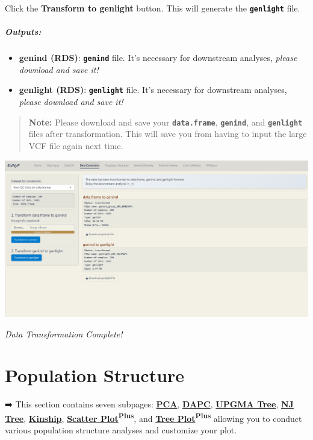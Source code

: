 \documentclass[
]{book}
\begin{document}
Click the {\textbf{Transform to genlight}} button. This will generate the {\textbf{\texttt{genlight}}} file.

\paragraph*{Outputs:}\label{outputs-4}

\begin{itemize}
\item
  \textbf{genind (RDS)}: {\textbf{\texttt{genind}}} file. It's necessary for downstream analyses, \emph{please download and save it!}
\item
  \textbf{genlight (RDS)}: {\textbf{\texttt{genlight}}} file. It's necessary for downstream analyses, \emph{please download and save it!}
\end{itemize}

\begin{quote}
\textbf{Note:} Please download and save your {\textbf{\texttt{data.frame}}}, {\textbf{\texttt{genind}}}, and {\textbf{\texttt{genlight}}} files after transformation. This will save you from having to input the large VCF file again next time.
\end{quote}

\includegraphics{images/圖片22.png}

\emph{Data Transformation Complete!}

\chapter{Population Structure}\label{sec-population-structure}

➡️ This section contains seven subpages: \ul{\textbf{PCA}}, \ul{\textbf{DAPC}}, \ul{\textbf{UPGMA Tree}}, \ul{\textbf{NJ Tree}}, \ul{\textbf{Kinship}}, \ul{\textbf{Scatter Plot}}\textsuperscript{\textbf{Plus}}, and \ul{\textbf{Tree Plot}}\textsuperscript{\textbf{Plus}} allowing you to conduct various population structure analyses and customize your plot.
\end{document}
